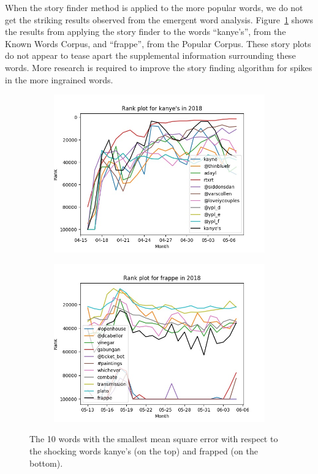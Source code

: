 \documentclass{article}
\begin{document}
When the story finder method is applied to the more popular words,
we do not get the striking results observed from the emergent word analysis.
Figure~\ref{Fig:BadStory} shows the results from applying the story finder to
the words ``kanye's'',
from the Known Words Corpus,
and ``frappe'',
from the Popular Corpus.
These story plots do not appear to tease apart the supplemental information
surrounding these words.
More research is required to improve the story finding algorithm for spikes in
the more ingrained words.

\begin{figure}
    \centering
    \begin{subfigure}{0.85\textwidth}
        \includegraphics[width=\textwidth]{kanye's-2018-shock-event-comparison.jpg}
    \end{subfigure}

    \begin{subfigure}{0.85\textwidth}
        \includegraphics[width=\textwidth]{frappe-2018-shock-event-comparison.jpg}
    \end{subfigure}
    \caption{\label{Fig:BadStory} The 10 words with the smallest mean square
error with respect to the shocking words kanye's (on the top) and 
frapped (on the bottom).}
\end{figure}
\end{document}
